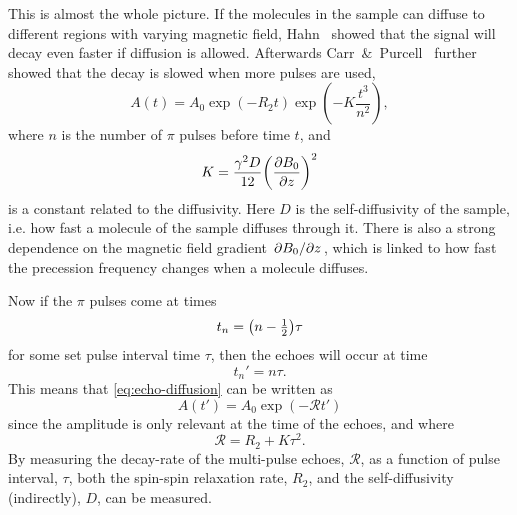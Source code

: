 \documentclass[11pt,a4paper, twocolumn,
swedish, english %
]{article}
\begin{document}
This is almost the whole picture. If the molecules in the sample can
diffuse to different regions with varying magnetic field,
Hahn~\cite{Hahn1950} showed that the signal will decay even faster if
diffusion is allowed. Afterwards
Carr~\&~Purcell~\cite{Carr-Purcell1954} further showed that the decay
is slowed when more pulses are used,
\begin{equation}\label{eq:echo-diffusion}
A(t)=A_0\exp(-R_2t)
\exp(-K\frac{t^3}{n^2}),
\end{equation}
where $n$ is the number of $\pi$ pulses before time $t$, and 
\begin{equation}\label{eq:K_simple}
K=\frac{\gamma^2D}{12}\qty(\pdv{B_0}{z})^2
\end{equation}
is a constant related to the diffusivity. Here $D$ is the
self-diffusivity of the sample, i.e. how fast a molecule of the sample
diffuses through it. There is also a strong dependence on the magnetic
field gradient $\pdv*{B_0}{z}$, which is linked to how fast the
precession frequency changes when a molecule diffuses.

Now if the $\pi$ pulses come at times
\begin{equation}
t_{n}=\qty(n-\tfrac{1}{2})\tau
\end{equation}
for some set pulse interval time $\tau$, then the echoes will occur at
time  
\begin{equation}
t_n'=n\tau.
\end{equation}
This means that \eqref{eq:echo-diffusion} can be written as
\begin{equation}\label{eq:multi-pulse_simple}
A(t')=A_0\exp(-\mathcal{R}t')
\end{equation}
since the amplitude is only relevant at the time of the echoes, and
where 
\begin{equation}\label{eq:multi-pulse-rate}
\mathcal{R}=R_2+K\tau^2.
\end{equation}
By measuring the decay-rate of the multi-pulse echoes, $\mathcal{R}$,
as a function of pulse interval, $\tau$, both the spin-spin relaxation
rate, $R_2$, and the self-diffusivity (indirectly), $D$, can be measured.
\end{document}
